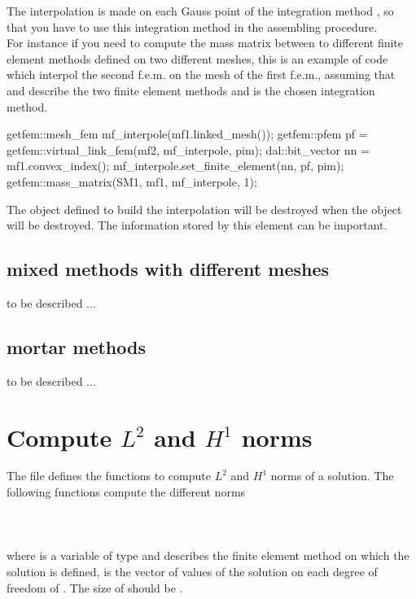 \documentclass[11pt,a4paper]{article}
\begin{document}
The interpolation is made on each Gauss point of the integration method , so that you have to use this integration method in the assembling procedure.\\[0.5cm]

For instance if you need to compute the mass matrix between to different finite element methods defined on two different meshes, this is an example of code which interpol the second f.e.m. on the mesh of the first f.e.m., assuming that  and  describe the two finite element methods and  is the chosen integration method.\\[0.5cm]
\begin{cppcode}
  getfem::mesh\_fem mf\_interpole(mf1.linked\_mesh());
  getfem::pfem pf = getfem::virtual\_link\_fem(mf2, mf\_interpole, pim);
  dal::bit\_vector nn = mf1.convex\_index();
  mf\_interpole.set\_finite\_element(nn, pf, pim);
  getfem::mass\_matrix(SM1, mf1, mf\_interpole, 1);
\end{cppcode}

The object defined to build the interpolation will be destroyed when the object  will be destroyed. The information stored by this element can be important.

\subsection{mixed methods with different meshes}
  to be described ...
\subsection{mortar methods}
  to be described ...


\section{Compute $L^2$ and $H^1$ norms}

The file  defines the functions to compute $L^2$ and $H^1$ norms of a solution. The following functions compute the different norms\\[0.5cm]
 \\[0.5cm]
 \\[0.5cm]
 \\[0.5cm]
where  is a variable of type  and describes the finite element method on which the solution is defined,  is the vector of values of the solution on each degree of freedom of . The size of   should be .\\[0.5cm]
\end{document}

